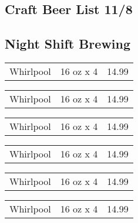 \documentclass[10pt]{article}
\begin{document}
  \pagestyle{empty}
  \renewcommand{\familydefault}{\sfdefault}
  \begin{multicols}{3}
  
  \section*{Craft Beer List 11/8}
  \subsection*{Night Shift Brewing}
    \begin{description}[before=\sffamily]
      \item[]\begin{tabular}{l c r}Whirlpool & 16 oz x 4 & 14.99\end{tabular}
      \item[]\begin{tabular}{l c r}Whirlpool & 16 oz x 4 & 14.99\end{tabular}
      \item[]\begin{tabular}{l c r}Whirlpool & 16 oz x 4 & 14.99\end{tabular}
      \item[]\begin{tabular}{l c r}Whirlpool & 16 oz x 4 & 14.99\end{tabular}
      \item[]\begin{tabular}{l c r}Whirlpool & 16 oz x 4 & 14.99\end{tabular}
      \item[]\begin{tabular}{l c r}Whirlpool & 16 oz x 4 & 14.99\end{tabular}
    \end{description}

\end{multicols}
\end{document}
